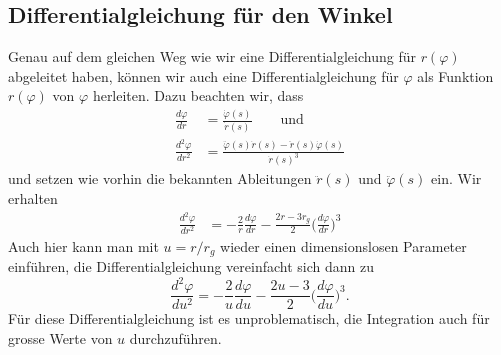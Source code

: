 \subsection{Differentialgleichung für den Winkel}
Genau auf dem gleichen Weg wie wir eine Differentialgleichung für $r(\varphi)$
abgeleitet haben, können wir auch eine Differentialgleichung für
$\varphi$ als Funktion $r(\varphi)$ von $\varphi$ herleiten.
Dazu beachten wir, dass
\begin{align*}
\frac{d\varphi}{dr}&=\frac{\dot \varphi(s)}{\dot r(s)}
\qquad\text{und}
\\
\frac{d^2\varphi}{dr^2}
&=
\frac{\ddot\varphi(s)\dot r(s)-\ddot r(s)\dot\varphi(s)}{\dot r(s)^3}
\end{align*}
und setzen wie vorhin die bekannten Ableitungen $\ddot r(s)$ und
$\ddot\varphi(s)$ ein.
Wir erhalten
\begin{align*}
\frac{d^2\varphi}{dr^2}
&=
-\frac{2}{r}\frac{d\varphi}{dr}
-\frac{2r-3r_g}{2}\biggl(\frac{d\varphi}{dr}\biggr)^3
\end{align*}
Auch hier kann man mit $u=r/r_g$ wieder einen dimensionslosen Parameter
einführen, die Differentialgleichung vereinfacht sich dann zu
\begin{equation}
\frac{d^2\varphi}{du^2}
=
-\frac2{u}\frac{d\varphi}{du} -\frac{2u-3}2\biggl(\frac{d\varphi}{du}\biggr)^3.
\label{skript:schwarzschild:phidgl}
\end{equation}
Für diese Differentialgleichung ist es unproblematisch, die
Integration auch für grosse Werte von $u$ durchzuführen.

